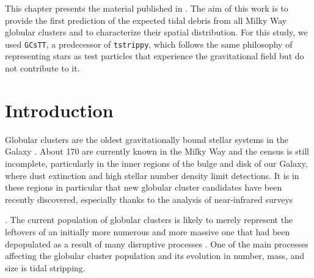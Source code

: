 This chapter presents the material published in \citet{2023A&A...673A..44F}. The aim of this work is to provide the first prediction of the expected tidal debris from all Milky Way globular clusters and to characterize their spatial distribution. For this study, we used \texttt{GCsTT}, a predecessor of \texttt{tstrippy}, which follows the same philosophy of representing stars as test particles that experience the gravitational field but do not contribute to it.

\section{Introduction}
    Globular clusters are the oldest gravitationally bound stellar systems in the Galaxy \citep{1997A&ARv...8....1M}. About 170 are currently known in the Milky Way \citep{2021MNRAS.505.5978V} and the census is still incomplete, particularly in the inner regions of the bulge and disk of our Galaxy, where  dust extinction and  high stellar number density limit detections. It is in these regions in particular that new globular cluster candidates have been recently discovered, especially thanks to the analysis of near-infrared surveys  

    \citep{2011A&A...527A..81M,2011A&A...535A..33M,2017ApJ...838L..14M,2017ApJ...849L..24M,2018ApJ...866...12M,2019A&A...628A..45G,2020A&A...642L..19G,2022A&A...659A.155G,2022A&A...658A.120G,2021A&A...649A..86G,2021A&A...650L..11M,2021A&A...652A.129M,2022MNRAS.509.4962G}.  The current population of globular clusters  is likely to merely represent the leftovers of an initially more numerous and more massive one that had been depopulated as a result of many disruptive processes \citep{1997ApJ...474..223G, 1997MNRAS.288..749M, 1997MNRAS.291..717M, 1997MNRAS.289..898V, 2001ApJ...561..751F}. One of the main processes affecting the globular cluster population and its evolution in number, mass, and size is tidal stripping.   

